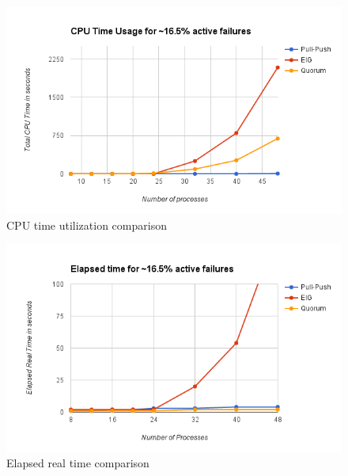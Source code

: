 \begin{figure}[ht] \centering
    \vspace{-2mm}
    \includegraphics[scale=0.4]{cpu16}
    \caption{CPU time utilization comparison} \label{fig:cpu}
    \vspace{-4mm}
    \end{figure}

\begin{figure}[ht] \centering 
    \vspace{-2mm}
    \includegraphics[scale=0.4]{elapsed16} \caption{Elapsed real time
    comparison} \label{fig:elapsed} 
    \vspace{-4mm}
\end{figure}


